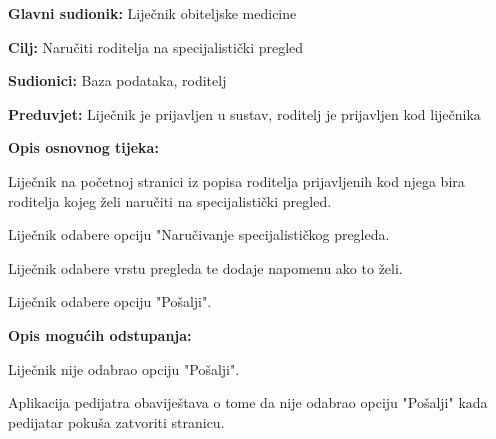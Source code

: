 					\noindent {}
					\begin{packed_item}
						
						\item \textbf{Glavni sudionik: }Liječnik obiteljske medicine
						\item  \textbf{Cilj:} Naručiti roditelja na specijalistički pregled
						\item  \textbf{Sudionici:} Baza podataka, roditelj
						\item  \textbf{Preduvjet:} Liječnik je prijavljen u sustav, roditelj je prijavljen kod liječnika
						\item  \textbf{Opis osnovnog tijeka:}
						
						\item[] \begin{packed_enum}
							
							\item Liječnik na početnoj stranici iz popisa roditelja prijavljenih kod njega bira roditelja kojeg želi naručiti na specijalistički pregled.
							\item Liječnik odabere opciju "Naručivanje specijalističkog pregleda.
							\item Liječnik odabere vrstu pregleda te dodaje napomenu ako to želi.
							\item Liječnik odabere opciju "Pošalji".
						\end{packed_enum}
						
						\item  \textbf{Opis mogućih odstupanja:}
						
						\item[] \begin{packed_item}
							
							\item[4.a] Liječnik nije odabrao opciju "Pošalji".
							\item[] \begin{packed_enum}
								
								\item Aplikacija pedijatra obaviještava o tome da nije odabrao opciju "Pošalji" kada pedijatar pokuša zatvoriti stranicu.
							\end{packed_enum}
							
							
						\end{packed_item}
						
						
					\end{packed_item}
					
